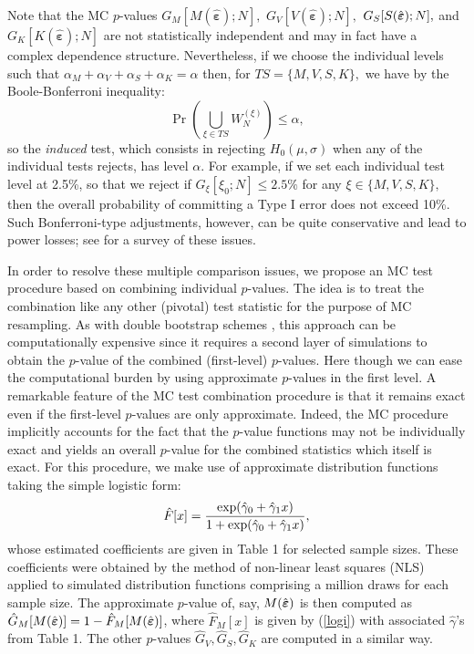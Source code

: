 \documentclass[11pt]{article}
\begin{document}
Note that the MC $p$-values $G_{M}[M(\hat{\boldsymbol{\varepsilon }});N],$ $%
G_{V}[V(\hat{\boldsymbol{\varepsilon }});N],$ $G_{S}[S(\hat{\boldsymbol{%
\varepsilon }});N],$ and $G_{K}[K(\hat{\boldsymbol{\varepsilon }});N]$ are
not statistically independent and may in fact have a complex dependence
structure. Nevertheless, if we choose the individual levels such that $%
\alpha _{M}+\alpha _{V}+\alpha _{S}+\alpha _{K}=\alpha $ then, for $%
TS=\{M,V,S,K\},$ we have by the Boole-Bonferroni inequality: 
\begin{equation*}
\Pr \left( \bigcup_{\xi \in TS}W_{N}^{(\xi )}\right) \leq \alpha ,
\end{equation*}%
so the \textit{induced} test, which consists in rejecting $H_{0}(\mu ,\sigma
)$ when any of the individual tests rejects, has level $\alpha $. For
example, if we set each individual test level at 2.5\%, so that we reject if 
$G_{\xi }[\xi _{0};N]\leq 2.5\%$ for any $\xi \in \{M,V,S,K\},$ then the
overall probability of committing a Type I error does not exceed 10\%. Such
Bonferroni-type adjustments, however, can be quite conservative and lead to
power losses; see \citet{Savin:1984} for a survey of these issues.

In order to resolve these multiple comparison issues, we propose an MC test
procedure based on combining individual $p$-values. The idea is to treat the
combination like any other (pivotal) test statistic for the purpose of MC
resampling. As with double bootstrap schemes \citep[][]{MacKinnon:2009},
this approach can be computationally expensive since it requires a second
layer of simulations to obtain the $p$-value of the combined (first-level) $p
$-values. Here though we can ease the computational burden by using
approximate $p$-values in the first level. A remarkable feature of the MC
test combination procedure is that it remains exact even if the first-level $%
p$-values are only approximate. Indeed, the MC procedure implicitly accounts
for the fact that the $p$-value functions may not be individually exact and
yields an overall $p$-value for the combined statistics which itself is
exact. For this procedure, we make use of approximate distribution functions
taking the simple logistic form: 
\begin{equation}
\hat{F}[x]=\frac{\exp (\hat{\gamma}_{0}+\hat{\gamma}_{1}x)}{1+\exp (\hat{%
\gamma}_{0}+\hat{\gamma}_{1}x)},  \label{logi}
\end{equation}%
whose estimated coefficients are given in Table 1 for selected sample sizes.
These coefficients were obtained by the method of non-linear least squares
(NLS) applied to simulated distribution functions comprising a million draws
for each sample size. The approximate $p$-value of, say, $M(\hat{\boldsymbol{%
\varepsilon }})$ is then computed as $\hat{G}_{M}[M(\hat{\boldsymbol{%
\varepsilon }})]=1-\hat{F}_{M}[M(\hat{\boldsymbol{\varepsilon }})]$, where $%
\hat{F}_{M}[x]$ is given by (\ref{logi}) with associated $\hat{\gamma}$'s
from Table 1. The other $p$-values $\hat{G}_{V},\hat{G}_{S},\hat{G}_{K}$ are
computed in a similar way.
\end{document}
